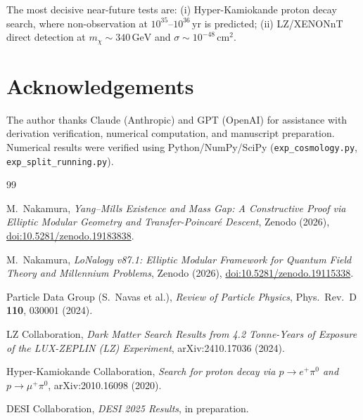 \documentclass[12pt]{article}
\theoremstyle{plain}
\theoremstyle{definition}
\numberwithin{equation}{section}
\begin{document}
The most decisive near-future tests are: (i) Hyper-Kamiokande proton
decay search, where non-observation at $10^{35}$--$10^{36}\,\mathrm{yr}$
is predicted; (ii) LZ/XENONnT direct detection at $m_\chi\sim340\,\mathrm{GeV}$
and $\sigma\sim10^{-48}\,\mathrm{cm}^2$.

\section*{Acknowledgements}

The author thanks Claude (Anthropic) and GPT (OpenAI) for assistance with
derivation verification, numerical computation, and manuscript preparation.
Numerical results were verified using Python/NumPy/SciPy
(\texttt{exp\_cosmology.py}, \texttt{exp\_split\_running.py}).

\begin{thebibliography}{99}

M.~Nakamura,
\textit{Yang--Mills Existence and Mass Gap: A Constructive Proof via
Elliptic Modular Geometry and Transfer-Poincar\'e Descent},
Zenodo (2026), \href{https://doi.org/10.5281/zenodo.19183838}{doi:10.5281/zenodo.19183838}.

M.~Nakamura,
\textit{LoNalogy v87.1: Elliptic Modular Framework for Quantum Field Theory
and Millennium Problems},
Zenodo (2026), \href{https://doi.org/10.5281/zenodo.19115338}{doi:10.5281/zenodo.19115338}.

Particle Data Group (S.~Navas et al.),
\textit{Review of Particle Physics},
Phys.\ Rev.\ D \textbf{110}, 030001 (2024).

LZ Collaboration,
\textit{Dark Matter Search Results from 4.2 Tonne-Years of Exposure
of the LUX-ZEPLIN (LZ) Experiment},
arXiv:2410.17036 (2024).

Hyper-Kamiokande Collaboration,
\textit{Search for proton decay via $p\to e^+\pi^0$ and $p\to\mu^+\pi^0$},
arXiv:2010.16098 (2020).

DESI Collaboration,
\textit{DESI 2025 Results},
in preparation.

\end{thebibliography}
\end{document}
